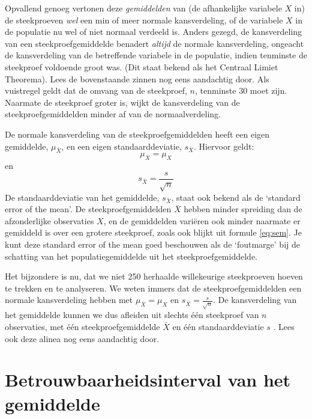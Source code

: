 \documentclass[
]{book}
\begin{document}
Opvallend genoeg vertonen deze \emph{gemiddelden} van (de afhankelijke
variabele \(X\) in) de steekproeven \emph{wel} een min of meer normale kansverdeling, of de
variabele \(X\) in de populatie nu wel of niet normaal verdeeld is. Anders
gezegd, de kansverdeling van een steekproefgemiddelde benadert \emph{altijd} de
normale kansverdeling, ongeacht de kansverdeling van de betreffende
variabele in de populatie, indien tenminste de steekproef voldoende
groot was. (Dit staat bekend als het Centraal Limiet Theorema). Lees de
bovenstaande zinnen nog eens aandachtig door. Als vuistregel geldt dat
de omvang van de steekproef, \(n\), tenminste 30 moet zijn. Naarmate de
steekproef groter is, wijkt de kansverdeling van de
steekproefgemiddelden minder af van de normaalverdeling.

De normale kansverdeling van de steekproefgemiddelden heeft een eigen
gemiddelde, \(\mu_{\bar{X}}\), en een eigen standaarddeviatie,
\(s_{\bar{X}}\). Hiervoor geldt:
\begin{equation}
    \mu_{\bar{X}} = \mu_X
    \label{eq:meanofmean}
\end{equation}
en
\begin{equation}
    s_{\bar{X}} = \frac{s}{\sqrt{n}}
    \label{eq:sem}
\end{equation}
De standaarddeviatie van het
gemiddelde, \(s_{\bar{X}}\), staat ook bekend als de `standard error of
the mean'. De steekproefgemiddelden \(\bar{X}\) hebben minder spreiding
dan de afzonderlijke observaties \(X\), en de gemiddelden variëren ook
minder naarmate er gemiddeld is over een grotere steekproef, zoals ook
blijkt uit formule \eqref{eq:sem}. Je kunt deze standard error of the mean goed
beschouwen als de `foutmarge' bij de schatting van het
populatiegemiddelde uit het steekproefgemiddelde.

Het bijzondere is nu, dat we niet 250 herhaalde willekeurige
steekproeven hoeven te trekken en te analyseren. We weten immers dat de
steekproefgemiddelden een normale kansverdeling hebben met
\(\mu_{\bar{X}} = \mu_X\) en \(s_{\bar{X}} = \frac{s}{\sqrt{n}}\). De
kansverdeling van het gemiddelde kunnen we dus afleiden uit slechts één
steekproef van \(n\) observaties, met één steekproefgemiddelde \(\bar{X}\)
en één standaarddeviatie \(s\) \citep{Cumm12}. Lees ook deze alinea nog eens
aandachtig door.

\hypertarget{sec:betrouwbaarheidsinterval-gemiddelde}{%
\section{Betrouwbaarheidsinterval van het gemiddelde}\label{sec:betrouwbaarheidsinterval-gemiddelde}}
\end{document}
